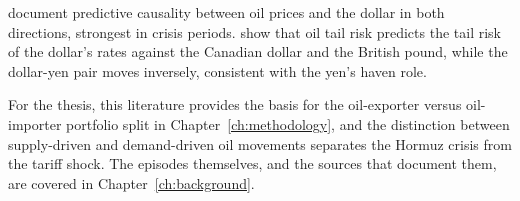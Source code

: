 \textcite{albulescu_ajmi_2021} document predictive causality between oil prices and the dollar in both directions, strongest in crisis periods. \textcite{salisu_olaniran_tchankam_2022} show that oil tail risk predicts the tail risk of the dollar's rates against the Canadian dollar and the British pound, while the dollar-yen pair moves inversely, consistent with the yen's haven role.

For the thesis, this literature provides the basis for the oil-exporter versus oil-importer portfolio split in Chapter~\ref{ch:methodology}, and the distinction between supply-driven and demand-driven oil movements \parencite{kilian_2009} separates the Hormuz crisis from the tariff shock. The episodes themselves, and the sources that document them, are covered in Chapter~\ref{ch:background}.



